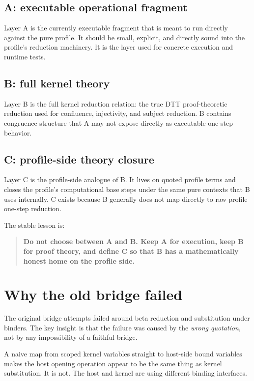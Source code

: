 \documentclass[11pt]{article}
\begin{document}
\subsection{A: executable operational fragment}

Layer A is the currently executable fragment that is meant to run directly against the pure profile. It should be small, explicit, and directly sound into the profile's reduction machinery. It is the layer used for concrete execution and runtime tests.

\subsection{B: full kernel theory}

Layer B is the full kernel reduction relation: the true DTT proof-theoretic reduction used for confluence, injectivity, and subject reduction. B contains congruence structure that A may not expose directly as executable one-step behavior.

\subsection{C: profile-side theory closure}

Layer C is the profile-side analogue of B. It lives on quoted profile terms and closes the profile's computational base steps under the same pure contexts that B uses internally. C exists because B generally does not map directly to raw profile one-step reduction.

The stable lesson is:

\begin{quote}
\textbf{Do not choose between A and B. Keep A for execution, keep B for proof theory, and define C so that B has a mathematically honest home on the profile side.}
\end{quote}

\section{Why the old bridge failed}

The original bridge attempts failed around beta reduction and substitution under binders. The key insight is that the failure was caused by the \emph{wrong quotation}, not by any impossibility of a faithful bridge.

A naive map from scoped kernel variables straight to host-side bound variables makes the host opening operation appear to be the same thing as kernel substitution. It is not. The host and kernel are using different binding interfaces.
\end{document}
